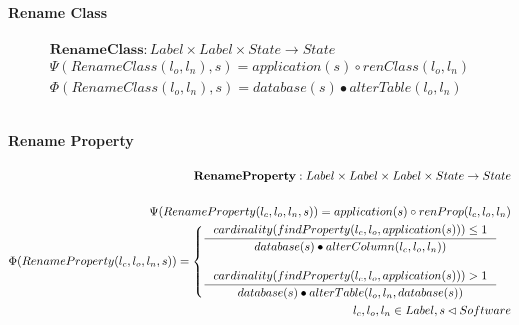 \documentclass[11pt]{article}
\begin{document}
\paragraph{Rename Class}
\begin{align*}
\mathbf{RenameClass} : Label \times Label \times State \rightarrow State \\ 
\Psi(RenameClass(l_o, l_n), s) = application(s) \circ renClass(l_o, l_n) \\
\Phi(RenameClass(l_o, l_n), s) = database(s) \bullet alterTable(l_o, l_n) \\ \\
\end{align*}

\paragraph{Rename Property}
\begin{align*}
	\mathbf{RenameProperty} : Label \times Label \times Label \times State \rightarrow State \\ \\
\Psi(RenameProperty(l_c, l_o, l_n, s)) = application(s) \circ renProp(l_c, l_o, l_n) \\
\Phi(RenameProperty(l_c, l_o, l_n, s)) = \begin{cases}
 	\inference{cardinality(findProperty(l_c, l_o, application(s))) \leq 1}{database(s) \bullet alterColumn(l_c, l_o, l_n))} \\\\
 	\inference{cardinality(findProperty(l_c, l_o, application(s))) > 1}{database(s) \bullet alterTable(l_o, l_n, database(s))}
 \end{cases}\\
l_c, l_o, l_n \in Label,  s \lhd Software
\end{align*}
\end{document}
